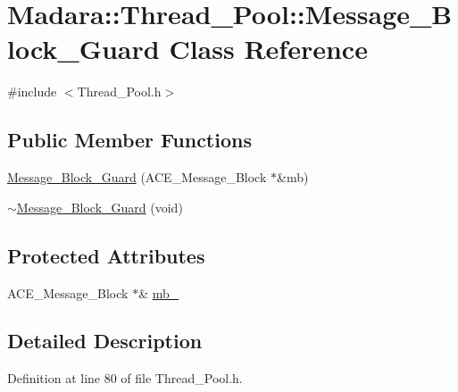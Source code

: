 \hypertarget{classMadara_1_1Thread__Pool_1_1Message__Block__Guard}{
\section{Madara::Thread\_\-Pool::Message\_\-Block\_\-Guard Class Reference}
\label{d5/d5e/classMadara_1_1Thread__Pool_1_1Message__Block__Guard}
}


{\ttfamily \#include $<$Thread\_\-Pool.h$>$}

\subsection*{Public Member Functions}
\begin{DoxyCompactItemize}
\item 
\hyperlink{classMadara_1_1Thread__Pool_1_1Message__Block__Guard_a3615489d6d725bf8591693bdf0c3d180}{Message\_\-Block\_\-Guard} (ACE\_\-Message\_\-Block $\ast$\&mb)
\item 
\hyperlink{classMadara_1_1Thread__Pool_1_1Message__Block__Guard_a3ba9023034a80448258e552a3746b6ff}{$\sim$Message\_\-Block\_\-Guard} (void)
\end{DoxyCompactItemize}
\subsection*{Protected Attributes}
\begin{DoxyCompactItemize}
\item 
ACE\_\-Message\_\-Block $\ast$\& \hyperlink{classMadara_1_1Thread__Pool_1_1Message__Block__Guard_acbab0a814c63feb8b0b6638e289ee0e0}{mb\_\-}
\end{DoxyCompactItemize}


\subsection{Detailed Description}


Definition at line 80 of file Thread\_\-Pool.h.



